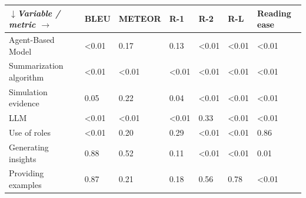\begin{tabular}{|l|l|l|l|l|l|l|}
\hline
\textit{$\downarrow$Variable / metric $\rightarrow$} & BLEU & METEOR & R-1 & R-2 & R-L & Reading ease \\
 \hline
 Agent-Based Model & \textless{}0.01 & 0.17 & 0.13 & \textless{}0.01 & \textless{}0.01 & \textless{}0.01 \\
 \hline
 Summarization algorithm & \textless{}0.01 & \textless{}0.01 & \textless{}0.01 & \textless{}0.01 & \textless{}0.01 & \textless{}0.01 \\
 \hline
 Simulation evidence & 0.05 & 0.22 & 0.04 & \textless{}0.01 & \textless{}0.01 & \textless{}0.01 \\
 \hline
 LLM & \textless{}0.01 & \textless{}0.01 & \textless{}0.01 & 0.33 & \textless{}0.01 & \textless{}0.01 \\
 \hline
 Use of roles & \textless{}0.01 & 0.20 & 0.29 & \textless{}0.01 & \textless{}0.01 & 0.86 \\
 \hline
 Generating insights & 0.88 & 0.52 & 0.11 & \textless{}0.01 & \textless{}0.01 & 0.01 \\
 \hline
 Providing examples & 0.87 & 0.21 & 0.18 & 0.56 & 0.78 & \textless{}0.01 \\
\hline
\end{tabular}
